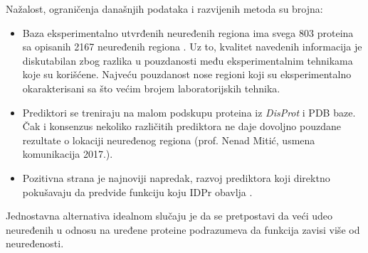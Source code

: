 Nažalost, ograničenja današnjih podataka i razvijenih metoda su brojna:
\begin{itemize}
  \item
    Baza eksperimentalno utvrđenih neuređenih regiona
    \textit{} ima svega 803 proteina sa opisanih 2167
    neuređenih regiona \parencite{Piovesan2016}.  Uz to, kvalitet navedenih
    informacija je diskutabilan zbog razlika u pouzdanosti među
    eksperimentalnim tehnikama koje su korišćene.  Najveću pouzdanost nose
    regioni koji su eksperimentalno okarakterisani sa što većim brojem
    laboratorijskih tehnika.

  \item
    Prediktori se treniraju na malom podskupu proteina iz \textit{DisProt}
    i PDB  baze. Čak i konsenzus nekoliko različitih prediktora ne daje
    dovoljno pouzdane rezultate o lokaciji neuređenog regiona (prof. Nenad
    Mitić, usmena komunikacija 2017.).

  \item 
    Pozitivna strana je najnoviji napredak, razvoj prediktora koji direktno
    pokušavaju da predvide funkciju koju IDPr obavlja \parencite{Meng_c2017}.

\end{itemize}

Jednostavna alternativa idealnom slučaju je da se pretpostavi da veći udeo neuređenih u odnosu
na uređene proteine podrazumeva da funkcija zavisi više od neuređenosti. 

